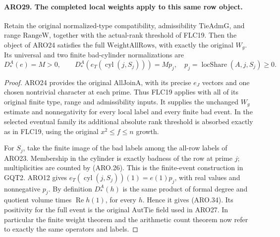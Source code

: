 \documentclass[11pt,a4paper]{article}
\numberwithin{equation}{section}
\theoremstyle{remark}\newtheorem{remark}[theorem]{Remark}
\begin{document}
\paragraph{ARO29. The completed local weights apply to this same row object.}
\label{claim:ARO29}
Retain the original normalized-type compatibility, admissibility
\(\mathrm{TieAdmG}\), and range \(\mathrm{RangeW}\), together
with the actual-rank threshold of FLC19.  Then the object of ARO24
satisfies the full \(\mathrm{WeightAllRows}\), with exactly the
original \(W_g\).  Its universal and two finite bad-cylinder
normalizations are
\[
 D_*^A(e)=M>0,\qquad
 D_*^A(e_T(\operatorname{cyl}(j,S_j)))=Mp_j,
 \quad p_j=\operatorname{locShare}(A,j,S_j)\geq0.      \tag{ARO.34}
\]
\begin{proof}
ARO24 provides the original \(\mathrm{AllJoinA}\), with its
precise \(e_J\) vectors and one chosen nontrivial character at
each prime.  Thus FLC19 applies with all of its original finite
type, range and admissibility inputs.  It supplies the unchanged
\(W_g\) estimate and nonnegativity for every local label and
every finite bad event.  In the selected eventual family its
additional absolute rank threshold is absorbed exactly as in FLC19,
using the original \(x^2\leq f\leq n\) growth.

For \(S_j\), take the finite image of the bad labels among the
all-row labels of ARO23.  Membership in the cylinder is exactly
badness of the row at prime \(j\); multiplicities are counted by
(ARO.26).  This is the finite-event construction in GQT2.
ARO12 gives \(e_T(\operatorname{cyl}(j,S_j))(1)=e(1)p_j\),
with real values and nonnegative \(p_j\).  By definition \(D_*^A(h)\)
is the same product of formal degree and quotient volume times
\(\operatorname{Re}h(1)\), for every \(h\).  Hence it gives
(ARO.34).  Its positivity for the full event is the original
\(\mathrm{AutTie}\) field used in ARO27.  In particular the
finite weight theorem and the arithmetic count theorem now refer
to exactly the same operators and labels.
\end{proof}

\end{document}

